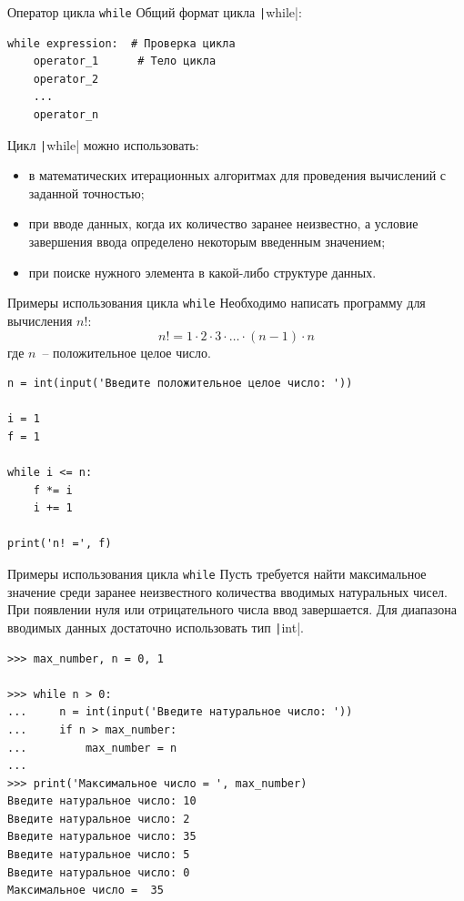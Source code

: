 \documentclass[aspectratio=169]{beamer}	%
\begin{document}
\begin{frame}[fragile]{Оператор цикла \texttt{while}}
\scriptsize
Общий формат цикла \texttt|while|: 

\begin{verbatim}
while expression:  # Проверка цикла
    operator_1      # Тело цикла
    operator_2
    ...
    operator_n
\end{verbatim}
Цикл \texttt|while| можно использовать:
\begin{itemize}
	\item  в математических итерационных алгоритмах для проведения вычислений с заданной точностью;
	\item  при вводе данных, когда их количество заранее неизвестно, а условие завершения ввода определено некоторым введенным значением;
	\item при поиске нужного элемента в какой-либо структуре данных.
\end{itemize}
\vfill
\end{frame}


\begin{frame}[fragile]{Примеры использования цикла \texttt{while}}
\scriptsize
Необходимо написать программу для вычисления $n!$:
\begin{equation*}
	n! = 1 \cdot 2 \cdot 3 \cdot \ldots \cdot \left(n - 1\right) \cdot n
\end{equation*}
где $n$~-- положительное целое число.
\begin{verbatim}
n = int(input('Введите положительное целое число: '))

i = 1
f = 1

while i <= n:
    f *= i
    i += 1

print('n! =', f)
\end{verbatim}
\vfill
\end{frame}


\begin{frame}[fragile]{Примеры использования цикла \texttt{while}}
\scriptsize
Пусть требуется найти максимальное значение среди заранее неизвестного количества вводимых натуральных чисел. При появлении нуля или отрицательного числа ввод завершается. Для диапазона вводимых данных достаточно использовать тип \texttt|int|.
\begin{verbatim}
>>> max_number, n = 0, 1

>>> while n > 0:
...     n = int(input('Введите натуральное число: '))
...     if n > max_number:
...         max_number = n
...
>>> print('Максимальное число = ', max_number)
Введите натуральное число: 10
Введите натуральное число: 2
Введите натуральное число: 35
Введите натуральное число: 5
Введите натуральное число: 0
Максимальное число =  35
\end{verbatim}
\vfill
\end{frame}
\end{document}
